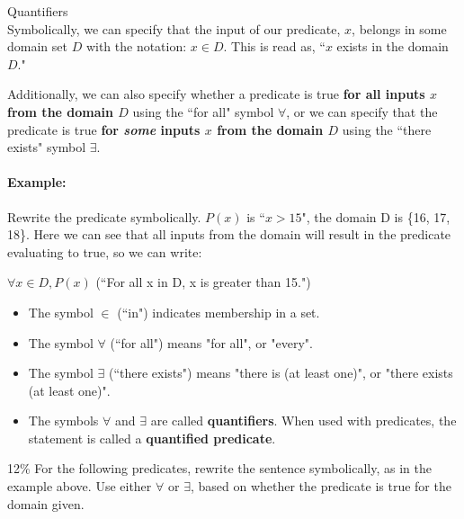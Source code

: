 \documentclass[a4paper,12pt]{book}
\begin{document}
        \begin{intro}{Quantifiers\\}
        Symbolically, we can specify that the input of our predicate, $x$,
        belongs in some domain set $D$ with the notation: $x \in D$.
        This is read as, ``$x$ exists in the domain $D$."

        Additionally, we can also specify whether a predicate is true
        \textbf{for all inputs $x$ from the domain $D$} using the ``for all"
        symbol $\forall$, or we can specify that the predicate is true
        \textbf{for \textit{some} inputs $x$ from the domain $D$} using
        the ``there exists" symbol $\exists$.{}

        \paragraph{Example:} Rewrite the predicate symbolically.
            $P(x)$ is ``$x > 15$", the domain D is \{16, 17, 18\}.
            Here we can see that all inputs from the domain will
            result in the predicate evaluating to true, so we can write:

            \begin{center}
                $ \forall x \in D, P(x) $ (``For all x in D, x is greater than 15.")
            \end{center}

        \begin{itemize}
            \item The symbol $\in$ (``in") indicates membership in a set.
            \item The symbol $\forall$ (``for all") means "for all", or "every".
            \item The symbol $\exists$ (``there exists") means "there is (at least one)", or "there exists (at least one)".
            \item The symbols $\forall$ and $\exists$ are called \textbf{quantifiers}. When used
                with predicates, the statement is called a \textbf{quantified predicate}.
        \end{itemize}
        \end{intro}

        
        \begin{question}{3}{12\%}
            For the following predicates, rewrite the sentence symbolically,
            as in the example above.
            Use either $\forall$ or $\exists$, based on whether the
            predicate is true for the domain given.
        \end{question}
\end{document}
